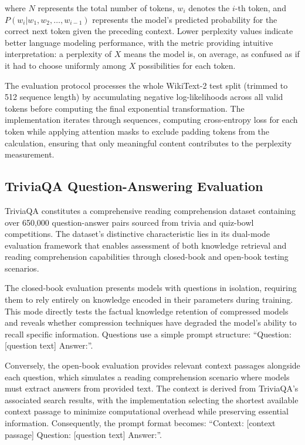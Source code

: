 where $N$ represents the total number of tokens, $w_i$ denotes the $i$-th token, and $P(w_i | w_1, w_2, \ldots, w_{i-1})$ represents the model's predicted probability for the correct next token given the preceding context.
Lower perplexity values indicate better language modeling performance, with the metric providing intuitive interpretation: a perplexity of $X$ means the model is, on average, as confused as if it had to choose uniformly among $X$ possibilities for each token.

The evaluation protocol processes the whole WikiText-2 test split (trimmed to 512 sequence length) by accumulating negative log-likelihoods across all valid tokens before computing the final exponential transformation. The implementation iterates through sequences, computing cross-entropy loss for each token while applying attention masks to exclude padding tokens from the calculation, ensuring that only meaningful content contributes to the perplexity measurement.

\subsection{TriviaQA Question-Answering Evaluation}

TriviaQA \cite{triviaqa} constitutes a comprehensive reading comprehension dataset containing over 650,000 question-answer pairs sourced from trivia and quiz-bowl competitions. The dataset's distinctive characteristic lies in its dual-mode evaluation framework that enables assessment of both knowledge retrieval and reading comprehension capabilities through closed-book and open-book testing scenarios.

The closed-book evaluation presents models with questions in isolation, requiring them to rely entirely on knowledge encoded in their parameters during training. This mode directly tests the factual knowledge retention of compressed models and reveals whether compression techniques have degraded the model's ability to recall specific information. Questions use a simple prompt structure: ``Question: [question text] Answer:''.

Conversely, the open-book evaluation provides relevant context passages alongside each question, which simulates a reading comprehension scenario where models must extract answers from provided text. The context is derived from TriviaQA's associated search results, with the implementation selecting the shortest available context passage to minimize computational overhead while preserving essential information. Consequently, the prompt format becomes: ``Context: [context passage] Question: [question text] Answer:''.

